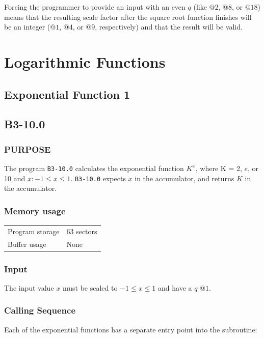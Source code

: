 \documentclass{article}
\begin{document}
Forcing the programmer to provide an input with an even $q$ (like $@2$, $@8$, or $@18$) means that the resulting scale factor after the square root function finishes will be an integer ($@1$, $@4$, or $@9$, respectively) and that the result will be valid. 

\newpage

\section{Logarithmic Functions}
\subsection{Exponential Function 1}
\label{sec:exponential_function_1}

\subsection*{B3-10.0}

\subsubsection*{PURPOSE}
The program \texttt{B3-10.0} calculates the exponential function $K^x$, where K = 2, $e$, or 10 and $x: -1 \le x \le 1$. \texttt{B3-10.0} expects $x$ in the accumulator, and returns $K$ in the accumulator.

\subsubsection*{Memory usage}
\begin{center}
\begin{tabular}{ll}
    \toprule
    Program storage & 63 sectors \\
    Buffer usage & None \\
    \bottomrule
\end{tabular}
\end{center}

\subsubsection*{Input}
The input value $x$ must be scaled to $-1 \le x \le 1$ and have a $q$ $@1$.

\subsubsection*{Calling Sequence}
Each of the exponential functions has a separate entry point into the subroutine:
\end{document}
